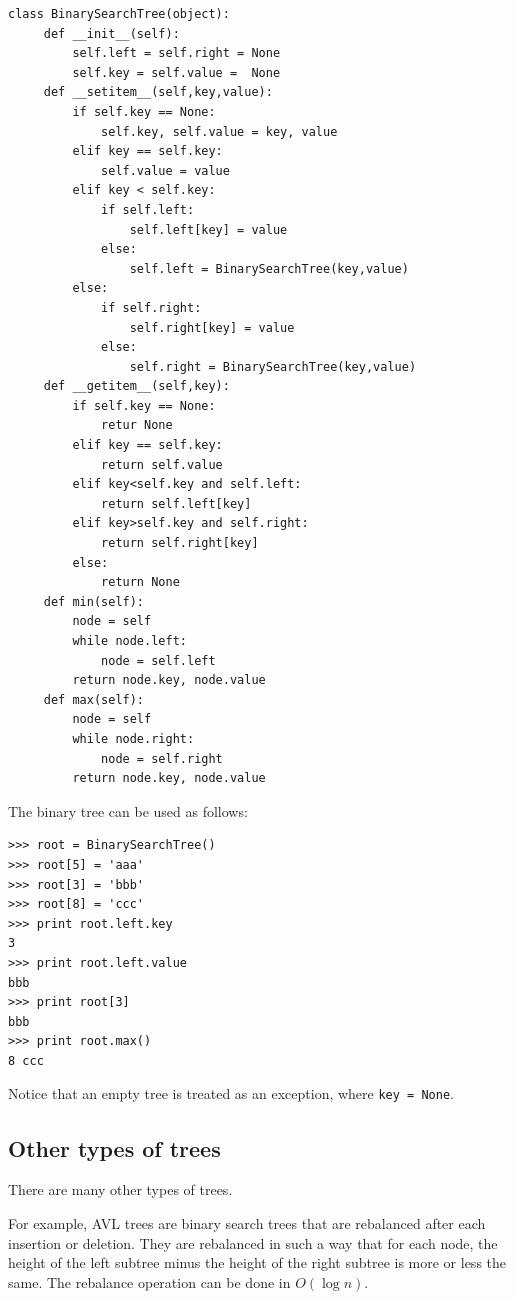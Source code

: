 \documentclass[justified,sixbynine]{tufte-book}
\def\ft{\small\tt}
\theoremstyle{plain}%
\theoremstyle{definition}
\theoremstyle{remark}
\begin{document}
\begin{fullwidth}
\begin{lstlisting}
class BinarySearchTree(object):
     def __init__(self):
         self.left = self.right = None
         self.key = self.value =  None
     def __setitem__(self,key,value):
         if self.key == None:
             self.key, self.value = key, value
         elif key == self.key:
             self.value = value
         elif key < self.key:
             if self.left:
                 self.left[key] = value
             else:
                 self.left = BinarySearchTree(key,value)
         else:
             if self.right:
                 self.right[key] = value
             else:
                 self.right = BinarySearchTree(key,value)
     def __getitem__(self,key):
         if self.key == None:
             retur None
         elif key == self.key:
             return self.value
         elif key<self.key and self.left:
             return self.left[key]
         elif key>self.key and self.right:
             return self.right[key]
         else:
             return None
     def min(self):
         node = self
         while node.left:
             node = self.left
         return node.key, node.value
     def max(self):
         node = self
         while node.right:
             node = self.right
         return node.key, node.value
\end{lstlisting}

The binary tree can be used as follows:

\begin{lstlisting}
>>> root = BinarySearchTree()
>>> root[5] = 'aaa'
>>> root[3] = 'bbb'
>>> root[8] = 'ccc'
>>> print root.left.key
3
>>> print root.left.value
bbb
>>> print root[3]
bbb
>>> print root.max()
8 ccc
\end{lstlisting}

Notice that an empty tree is treated as an exception, where {\ft key = None}.

\goodbreak\subsection{Other types of trees}

There are many other types of trees. 

For example, AVL trees are binary search trees that are rebalanced after each
insertion or deletion. They are rebalanced in such a way that for each node, the
height of the left subtree minus the height of the right subtree is more or less the same. The rebalance operation can be done in $O(\log n)$.


\end{fullwidth}
\end{document}
